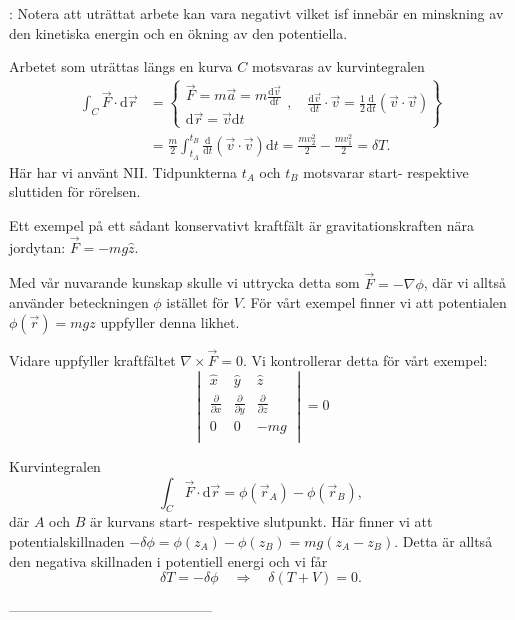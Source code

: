 \documentclass[%
oneside,                 %
final,                   %
10pt]{article}
\newcommand{\longinlinecomment}[3]{{\color{red}{\bf #1}: #2}}
\begin{document}
\longinlinecomment{Comment 1}{ Notera att uträttat arbete kan vara negativt vilket isf innebär en minskning av den kinetiska energin och en ökning av den potentiella. }{ Notera att uträttat arbete }

Arbetet som uträttas längs en kurva $C$ motsvaras av kurvintegralen
\begin{align}
\int_C \vec{F} \cdot \mbox{d}\vec{r} &= \left\{ \begin{array}{l}
\vec{F} = m \vec{a} = m \frac{\mbox{d}\vec{v}}{\mbox{d}t} \\
\mbox{d}\vec{r} = \vec{v} \mbox{d}t
\end{array} 
, \quad \frac{\mbox{d}\vec{v}}{\mbox{d}t} \cdot \vec{v} = \frac{1}{2}\frac{\mbox{d}}{\mbox{d}t} (\vec{v} \cdot \vec{v})
\right\} \\
&= \frac{m}{2} \int_{t_A}^{t_B} \frac{\mbox{d}}{\mbox{d}t} (\vec{v} \cdot \vec{v}) \mbox{d}t = \frac{m v_2^2}{2} - \frac{m v_1^2}{2} = \delta T.
\end{align}
Här har vi använt NII. Tidpunkterna $t_A$ och $t_B$ motsvarar start- respektive sluttiden för rörelsen.

Ett exempel på ett sådant konservativt kraftfält är gravitationskraften nära jordytan: $\vec{F} = - m g \hat{z}$.

Med vår nuvarande kunskap skulle vi uttrycka detta som $\vec{F} = -\nabla \phi$, där vi alltså använder beteckningen $\phi$ istället för $V$. För vårt exempel finner vi att potentialen $\phi(\vec{r}) = m g z$ uppfyller denna likhet.

Vidare uppfyller kraftfältet $\nabla \times \vec{F} = 0$. Vi kontrollerar detta för vårt exempel: 
$$
\begin{vmatrix}
\hat{x} & \hat{y} & \hat{z} \\
\frac{\partial}{\partial x} & \frac{\partial}{\partial y} & \frac{\partial}{\partial z} \\
\mbox{0}  &  \mbox{0}  & -mg \\
\end{vmatrix}
= 0
$$

Kurvintegralen
$$
\int_C \vec{F} \cdot \mbox{d}\vec{r} = \phi\left( \vec{r}_A \right) - \phi\left( \vec{r}_B \right),
$$
där $A$ och $B$ är kurvans start- respektive slutpunkt. Här finner vi att potentialskillnaden $-\delta \phi = \phi(z_A) - \phi(z_B) = mg (z_A-z_B)$. Detta är alltså den negativa skillnaden i potentiell energi och vi får
$$
\delta T = - \delta \phi \quad \Rightarrow \quad \delta(T+V) = 0.
$$

--------------------------------------------
\end{document}

